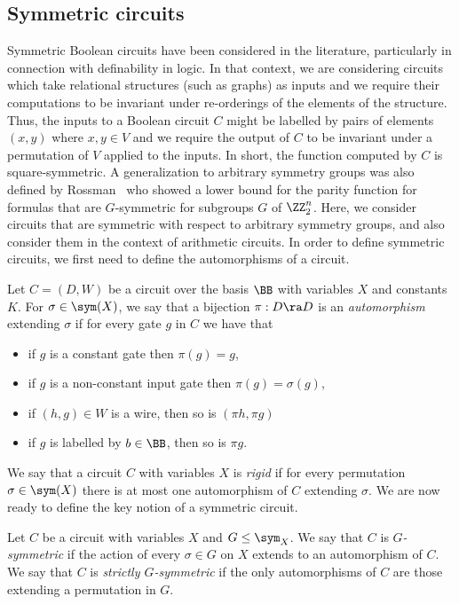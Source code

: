 \documentclass{toc}
\begin{document}
\subsection{Symmetric circuits}
Symmetric Boolean circuits have been considered in the literature, particularly
in connection with definability in logic. In that context, we are considering
circuits which take relational structures (such as graphs) as inputs and we
require their computations to be invariant under re-orderings of the elements of
the structure.  Thus, the inputs to a Boolean circuit $C$ might be labelled by pairs of elements $(x,y)$ where $x,y \in V$ and we require the output of $C$ to be invariant under a permutation of $V$ applied to the inputs.  In short, the function computed by $C$ is square-symmetric.  A generalization to arbitrary symmetry groups was also defined by Rossman~\cite{Rossman19} who showed a lower bound for the parity function for formulas that are $G$-symmetric for subgroups $G$ of $\ZZ_2^n$.
Here, we consider circuits that are symmetric with respect to arbitrary symmetry groups, and also consider them in the context of arithmetic circuits. In order to define
symmetric circuits, we first need to define the automorphisms of a circuit.
\begin{definition}
  Let $C = (D, W)$ be a circuit over the basis $\BB$ with variables $X$ and
  constants $K$. For $\sigma \in \sym(X)$, we say that a bijection $\pi : D \ra
  D$ is an \emph{automorphism} extending $\sigma$ if for every gate $g$ in $C$
  we have that
  \begin{itemize}
  \item if $g$ is a constant gate then $\pi (g) = g$,
  \item if $g$ is a non-constant input gate then $\pi (g) = \sigma (g)$,
  \item if $(h,g) \in W$ is a wire, then so is $(\pi h, \pi g)$
  \item if $g$ is labelled by $b \in \BB$, then so is $\pi g$.
  \end{itemize}
\end{definition}
We say that a circuit $C$ with variables $X$ is \emph{rigid} if for every
permutation $\sigma \in \sym(X)$ there is at most one automorphism of $C$
extending $\sigma$.
We are now ready to define the key notion of a symmetric circuit.
\begin{definition}
  Let $C$ be a circuit with variables $X$ and $G \leq \sym_X$. We say that
  $C$ is
  \emph{$G$-symmetric} if the action of every $\sigma \in G$ on $X$ extends to
  an automorphism of $C$. We say that $C$ is \emph{strictly $G$-symmetric} if the only automorphisms of $C$ are those extending a permutation in $G$.
\end{definition}
\end{document}
